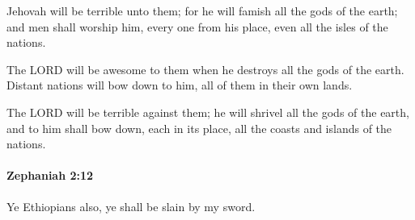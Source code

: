			\begin{versebox}
					\item[BHS] 
					\item[LXX] 
					\item[ASV] Jehovah will be terrible unto them; for he will famish all the gods of the earth; and men shall worship him, every one from his place, even all the isles of the nations.
					\item[NIV] The LORD will be awesome to them when he destroys all the gods of the earth. Distant nations will bow down to him, all of them in their own lands.
					\item[NRSV] The LORD will be terrible against them; he will shrivel all the gods of the earth, and to him shall bow down, each in its place, all the coasts and islands of the nations.
			\end{versebox}

		\paragraph{Zephaniah 2:12} %
			\label{ZEPHANIAH-2-12}

			Ye Ethiopians also, ye shall be slain by my sword.

